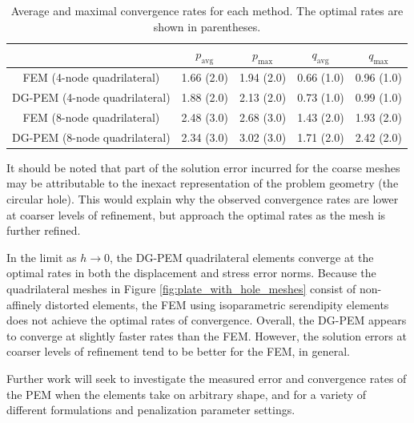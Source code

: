 \begin{table}[!ht]
  \begin{center}
    \begin{tabular}{| c || c | c || c | c |}
    \hline
           & $p_{\text{avg}}$ & $p_{\text{max}}$ & $q_{\text{avg}}$ & $q_{\text{max}}$ \\ \hline \hline
    FEM (4-node quadrilateral)    & 1.66 (2.0) & 1.94 (2.0) & 0.66 (1.0) & 0.96 (1.0) \\ \hline
    DG-PEM (4-node quadrilateral) & 1.88 (2.0) & 2.13 (2.0) & 0.73 (1.0) & 0.99 (1.0) \\ \hline
    FEM (8-node quadrilateral)    & 2.48 (3.0) & 2.68 (3.0) & 1.43 (2.0) & 1.93 (2.0) \\ \hline
    DG-PEM (8-node quadrilateral) & 2.34 (3.0) & 3.02 (3.0) & 1.71 (2.0) & 2.42 (2.0) \\
    \hline
    \end{tabular}
    \caption{Average and maximal convergence rates for each method. The optimal rates are shown in parentheses.}
    \vspace{-5pt}
    \label{tab:plate_with_hole_convergence_rates}
    \vspace{-10pt}
  \end{center}
\end{table}

It should be noted that part of the solution error incurred for the coarse meshes may be attributable to the inexact representation of the problem geometry (the circular hole). This would explain why the observed convergence rates are lower at coarser levels of refinement, but approach the optimal rates as the mesh is further refined.

In the limit as $h \rightarrow 0$, the DG-PEM quadrilateral elements converge at the optimal rates in both the displacement and stress error norms. Because the quadrilateral meshes in Figure \ref{fig:plate_with_hole_meshes} consist of non-affinely distorted elements, the FEM using isoparametric serendipity elements does not achieve the optimal rates of convergence. Overall, the DG-PEM appears to converge at slightly faster rates than the FEM. However, the solution errors at coarser levels of refinement tend to be better for the FEM, in general.

Further work will seek to investigate the measured error and convergence rates of the PEM when the elements take on arbitrary shape, and for a variety of different formulations and penalization parameter settings.

